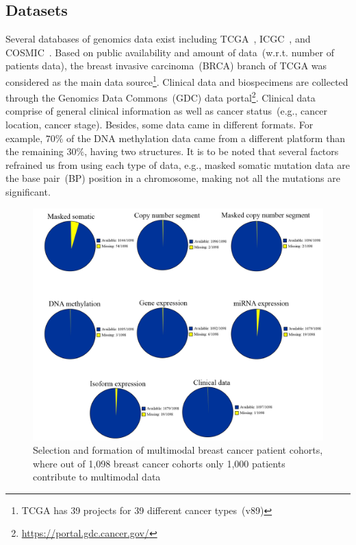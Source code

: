 \subsection{Datasets}
\label{dc}
Several databases of genomics data exist including TCGA~\cite{tcga}, ICGC~\cite{icgc}, and COSMIC~\cite{forbes}. Based on public availability and amount of data~(w.r.t. number of patients data), the breast invasive carcinoma~(BRCA) branch of TCGA was considered as the main data source\footnote{TCGA has 39 projects for 39 different cancer types~(v89)}. Clinical data and biospecimens are collected through the Genomics Data Commons~(GDC) data portal\footnote{\url{https://portal.gdc.cancer.gov/}}. Clinical data comprise of general clinical information as well as cancer status~(e.g., cancer location, cancer stage). Besides, some data came in different formats. For example, $70\%$ of the DNA methylation data came from a different platform than the remaining $30\%$, having two structures. It is to be noted that several factors refrained us from using each type of data, e.g., masked somatic mutation data are the base pair~(BP) position in a chromosome, making not all the mutations are significant. 

\begin{figure}
  \centering
  \includegraphics[scale=0.55]{images/data_per_patients}
  \caption[Selection and formation of multimodal breast cancer patient cohorts]{Selection and formation of multimodal breast cancer patient cohorts, where out of 1,098 breast cancer cohorts only 1,000 patients  contribute to multimodal data }
  \label{fig:data_per_patients}
\end{figure}

